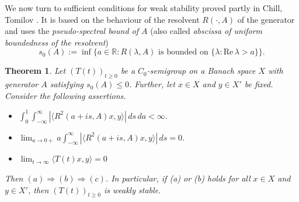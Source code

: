 \documentclass[11pt,intlimits, draft,oneside]{amsart}
\newtheorem{thm}{Theorem}[section]
\theoremstyle{definition}
\renewcommand{\Re}{\mathrm{Re}\,}
\def\dd{\,d}
\def\RR{\mathbb{R}}
\begin{document}
We now turn to sufficient conditions for weak stability proved
partly in Chill, Tomilov \cite{chill/tomilov:2003}. It is based on
the behaviour of the resolvent $R(\cdot, A)$ of the generator and
uses the \emph{pseudo-spectral bound of $A$} (also called
\emph{abscissa of uniform boundedness of the resolvent})
\begin{equation*}s_0(A):= \inf\bigl\{a\in \RR: R(\lambda,A) \text{ is bounded on } \{\lambda: \Re\lambda >a\}\bigr\}. \end{equation*}
%
\begin{thm} \label{thm:weakstab:integral}
Let $(T(t))_{t \geq 0}$ be a $C_0$-semigroup on a Banach space $X$
with generator $A$ satisfying $s_0(A) \leq 0$. Further, let $x\in X$
and $y\in X'$ be fixed. Consider the following assertions.
\begin{itemize}
\item[(a)]\hfil
$\displaystyle \int_0^1 \int_{-\infty}^{\infty} |\langle
R^2(a+is,A)x,y \rangle| \dd s\dd a < \infty$.
%
\item[(b)]\hfil$\displaystyle\lim_{a\to 0+}a \int_{-\infty}^{\infty} |\langle R^2(a+is,A)x,y
\rangle| \dd s = 0$.
%
\item[(c)] \hfil$\displaystyle \lim_{t\to \infty} \langle T(t)x,y \rangle = 0$
\end{itemize}
Then $(a)\Rightarrow (b)\Rightarrow (c)$. In particular, if (a) or
(b) holds for all $x \in X$ and $y \in X'$, then $(T(t))_{t \geq 0}$
is weakly stable.
\end{thm}
%
\end{document}

